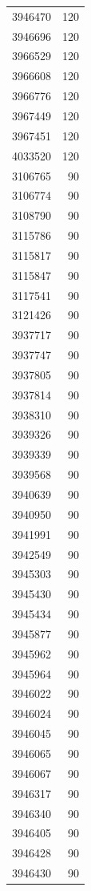 \begin{table}[ht]
\begin{tabular}{lr}
  3946470 & 120 \\ 
  3946696 & 120 \\ 
  3966529 & 120 \\ 
  3966608 & 120 \\ 
  3966776 & 120 \\ 
  3967449 & 120 \\ 
  3967451 & 120 \\ 
  4033520 & 120 \\ 
  3106765 &  90 \\ 
  3106774 &  90 \\ 
  3108790 &  90 \\ 
  3115786 &  90 \\ 
  3115817 &  90 \\ 
  3115847 &  90 \\ 
  3117541 &  90 \\ 
  3121426 &  90 \\ 
  3937717 &  90 \\ 
  3937747 &  90 \\ 
  3937805 &  90 \\ 
  3937814 &  90 \\ 
  3938310 &  90 \\ 
  3939326 &  90 \\ 
  3939339 &  90 \\ 
  3939568 &  90 \\ 
  3940639 &  90 \\ 
  3940950 &  90 \\ 
  3941991 &  90 \\ 
  3942549 &  90 \\ 
  3945303 &  90 \\ 
  3945430 &  90 \\ 
  3945434 &  90 \\ 
  3945877 &  90 \\ 
  3945962 &  90 \\ 
  3945964 &  90 \\ 
  3946022 &  90 \\ 
  3946024 &  90 \\ 
  3946045 &  90 \\ 
  3946065 &  90 \\ 
  3946067 &  90 \\ 
  3946317 &  90 \\ 
  3946340 &  90 \\ 
  3946405 &  90 \\ 
  3946428 &  90 \\ 
  3946430 &  90 \\ 

\end{tabular}
\end{table}
